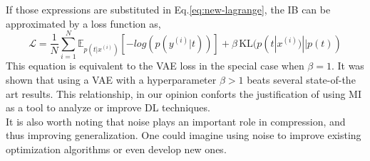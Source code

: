 \documentclass[twocolumn,superscriptaddress,aps]{revtex4-1}
\begin{document}
If those expressions are substituted in Eq.\ref{eq:new-lagrange}, the IB can be approximated by a loss function as,
$$
\mathcal{L} = \frac{1}{N} \sum_{i=1}^{N} \mathbb{E}_{p(t|x^{(i)})} \left[-log(p(y^{(i)}|t))\right] + \beta \, \text{KL}(p(t|x^{(i)}) || p(t))
$$
This equation is equivalent to the VAE loss in the special case when $\beta = 1$. It was shown that using a VAE with a hyperparameter $\beta > 1$ beats several state-of-the art results. This relationship, in our opinion conforts the justification of using MI as a tool to analyze or improve DL techniques. \\
\indent It is also worth noting that noise plays an important role in compression, and thus improving generalization. One could imagine using noise to improve existing optimization algorithms or even develop new ones.\\




\end{document}

